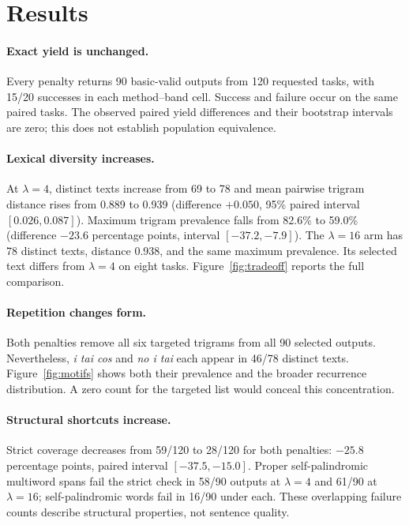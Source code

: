 \documentclass[11pt]{article}
\begin{document}
\section{Results}
\paragraph{Exact yield is unchanged.}
Every penalty returns 90 basic-valid outputs from 120 requested tasks, with 15/20 successes in each method--band cell. Success and failure occur on the same paired tasks. The observed paired yield differences and their bootstrap intervals are zero; this does not establish population equivalence.

\paragraph{Lexical diversity increases.}
At $\lambda=4$, distinct texts increase from 69 to 78 and mean pairwise trigram distance rises from 0.889 to 0.939 (difference $+0.050$, 95\% paired interval $[0.026,0.087]$). Maximum trigram prevalence falls from 82.6\% to 59.0\% (difference $-23.6$ percentage points, interval $[-37.2,-7.9]$). The $\lambda=16$ arm has 78 distinct texts, distance 0.938, and the same maximum prevalence. Its selected text differs from $\lambda=4$ on eight tasks. Figure~\ref{fig:tradeoff} reports the full comparison.

\paragraph{Repetition changes form.}
Both penalties remove all six targeted trigrams from all 90 selected outputs. Nevertheless, \emph{i tai cos} and \emph{no i tai} each appear in 46/78 distinct texts. Figure~\ref{fig:motifs} shows both their prevalence and the broader recurrence distribution. A zero count for the targeted list would conceal this concentration.

\paragraph{Structural shortcuts increase.}
Strict coverage decreases from 59/120 to 28/120 for both penalties: $-25.8$ percentage points, paired interval $[-37.5,-15.0]$. Proper self-palindromic multiword spans fail the strict check in 58/90 outputs at $\lambda=4$ and 61/90 at $\lambda=16$; self-palindromic words fail in 16/90 under each. These overlapping failure counts describe structural properties, not sentence quality.
\end{document}
